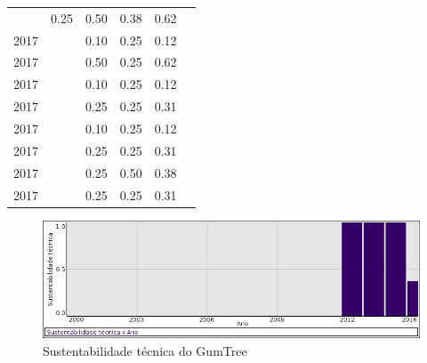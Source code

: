 \begin{table}[H]
\begin{tabular}{| l | c | c | c | c | c |}
          &
          0.25
          &
          0.50
          &
          0.38
          &
            {\color{blue} 0.62}
          \\
            2017
          &
          
          &
          0.10
          &
          0.25
          &
          0.12
          &
          \\
            2017
          &
          
          &
          0.50
          &
          0.25
          &
          0.62
          &
          \\
            2017
          &
          
          &
          0.10
          &
          0.25
          &
          0.12
          &
          \\
            2017
          &
          
          &
          0.25
          &
          0.25
          &
          0.31
          &
          \\
            2017
          &
          
          &
          0.10
          &
          0.25
          &
          0.12
          &
          \\
            2017
          &
          
          &
          0.25
          &
          0.25
          &
          0.31
          &
          \\
            2017
          &
          
          &
          0.25
          &
          0.50
          &
          0.38
          &
          \\
            2017
          &
          
          &
          0.25
          &
          0.25
          &
          0.31
          &
          \\
\hline
\end{tabular}
\end{table}

\begin{figure}[h]
  \center
  \includegraphics[scale=0.50]{imagens/softwares-charts/gumtree.png}
  \caption{Sustentabilidade técnica do GumTree}
\end{figure}


